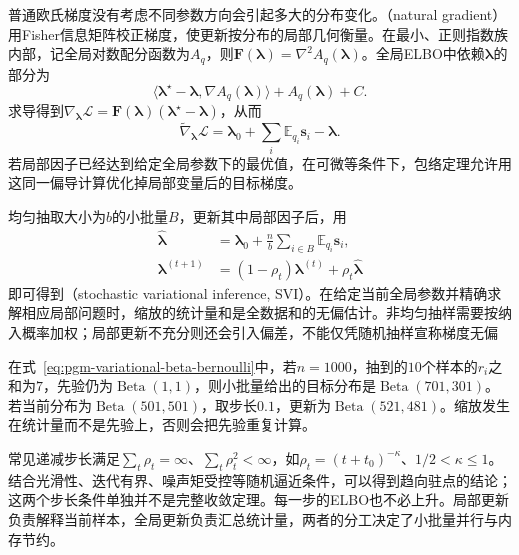 普通欧氏梯度没有考虑不同参数方向会引起多大的分布变化。（natural gradient）用Fisher信息矩阵校正梯度，使更新按分布的局部几何衡量。在最小、正则指数族内部，记全局对数配分函数为$A_q$，则$\bm F(\bm{\lambda})=\nabla^2 A_q(\bm{\lambda})$。全局ELBO中依赖$\bm{\lambda}$的部分为
\[
  \langle\bm{\lambda}^\star-\bm{\lambda},
            \nabla A_q(\bm{\lambda})\rangle+A_q(\bm{\lambda})+C.
\]
求导得到$\nabla_{\bm{\lambda}}\mathcal L=\bm F(\bm{\lambda})(\bm{\lambda}^\star-\bm{\lambda})$，从而
\begin{equation}
  \widetilde\nabla_{\bm{\lambda}}\mathcal L
    =\bm{\lambda}_0+\sum_i\mathbb E_{q_i}\bm s_i-\bm{\lambda}.
  \label{eq:pgm-variational-natural-gradient}
\end{equation}
若局部因子已经达到给定全局参数下的最优值，在可微等条件下，包络定理允许用这同一偏导计算优化掉局部变量后的目标梯度。

均匀抽取大小为$b$的小批量$B$，更新其中局部因子后，用
\begin{equation}
  \begin{aligned}
    \widehat{\bm{\lambda}}
      &=\bm{\lambda}_0+\frac{n}{b}
           \sum_{i\in B}\mathbb E_{q_i}\bm s_i,\\
    \bm{\lambda}^{(t+1)}
      &=(1-\rho_t)\bm{\lambda}^{(t)}
          +\rho_t\widehat{\bm{\lambda}}
  \end{aligned}
  \label{eq:pgm-variational-svi}
\end{equation}
即可得到（stochastic variational inference, SVI）。在给定当前全局参数并精确求解相应局部问题时，缩放的统计量和是全数据和的无偏估计。非均匀抽样需要按纳入概率加权；局部更新不充分则还会引入偏差，不能仅凭随机抽样宣称梯度无偏

在式~\eqref{eq:pgm-variational-beta-bernoulli}中，若$n=1000$，抽到的$10$个样本的$r_i$之和为$7$，先验仍为$\operatorname{Beta}(1,1)$，则小批量给出的目标分布是$\operatorname{Beta}(701,301)$。若当前分布为$\operatorname{Beta}(501,501)$，取步长$0.1$，更新为$\operatorname{Beta}(521,481)$。缩放发生在统计量而不是先验上，否则会把先验重复计算。

常见递减步长满足$\sum_t\rho_t=\infty$、$\sum_t\rho_t^2<\infty$，如$\rho_t=(t+t_0)^{-\kappa}$、$1/2<\kappa\leq1$。结合光滑性、迭代有界、噪声矩受控等随机逼近条件，可以得到趋向驻点的结论；这两个步长条件单独并不是完整收敛定理。每一步的ELBO也不必上升。局部更新负责解释当前样本，全局更新负责汇总统计量，两者的分工决定了小批量并行与内存节约。

\label{sec:pgm-variational-amortized}

